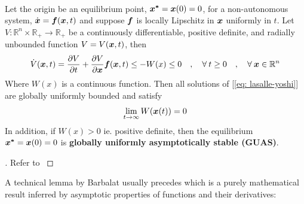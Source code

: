\documentclass[12pt]{ucthesis}
\begin{document}
\begin{thm} \alignright \citet[Thm. 2.1/A.8]{Krstic95} \label{thm: lasalle-yoshi}\\
	Let the origin be an equilibrium point, $\boldsymbol{x^*}=\boldsymbol{x}(0)=0$, for a non-autonomous system, $\dot{\boldsymbol{x}} = \boldsymbol{f}(\boldsymbol{x},t)$ and suppose $\boldsymbol{f}$ is locally Lipschitz in $\boldsymbol{x}$ uniformly in $t$. Let $V:\mathbb{R}^n \times \mathbb{R}_+ \rightarrow \mathbb{R}_+$ be a continuously differentiable, positive definite, and radially unbounded function $V = V(\boldsymbol{x},t)$, then
	\begin{equation}
		\dot{V}(\boldsymbol{x},t) = \frac{\partial V}{\partial t} + \frac{\partial V}{\partial\boldsymbol{x}} \boldsymbol{f}(\boldsymbol{x},t) \leq -W(x) \leq 0 \quad,\quad \forall \: t \geq 0 \quad,\quad \forall \: \boldsymbol{x} \in \mathbb{R}^n
		\label{eq: lasalle-yoshi}
	\end{equation}
	Where $W(x)$ is a continuous function. Then all solutions of [\autoref{eq: lasalle-yoshi}] are globally uniformly bounded and satisfy
	\begin{equation}
		\lim_{t \rightarrow \infty} W(\boldsymbol{x}(t)) = 0
	\end{equation}
	In addition, if $W(x)>0$ ie. positive definite, then the equilibrium $\boldsymbol{x^*}=\boldsymbol{x}(0)=0$ is \textbf{globally uniformly asymptotically stable (GUAS)}.
\end{thm}

\begin{proof}[]
	Refer to \citet[Appendix A, Pg. 492]{Krstic95}
\end{proof}

A technical lemma by Barbalat usually precedes  which is a purely mathematical result inferred by asymptotic properties of functions and their derivatives:
\end{document}

